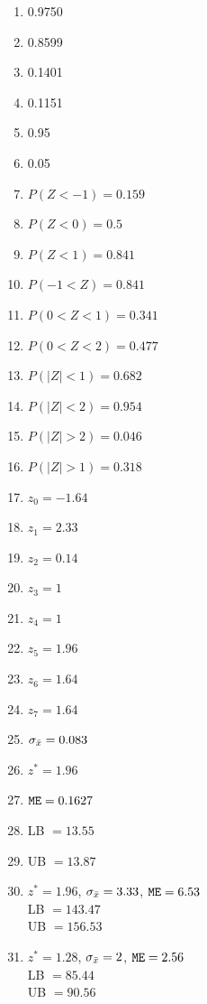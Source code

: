 \documentclass[12pt,letterpaper]{article}
\begin{document}
\newpage
\begin{multicols}{2}
\begin{enumerate}
\item 0.9750
\item 0.8599
\item 0.1401
\item 0.1151
\item 0.95
\item 0.05

\item $P(Z<-1)=0.159$
\item $P(Z<0) = 0.5$
\item $P(Z<1) = 0.841$
\item $P(-1<Z) = 0.841$
\item $P(0<Z<1) = 0.341$
\item $P(0<Z<2) = 0.477$
\item $P(|Z|<1) = 0.682$
\item $P(|Z|<2) = 0.954$
\item $P(|Z|>2) = 0.046$
\item $P(|Z|>1) = 0.318$

\item $z_0 = -1.64$
\item $z_1 = 2.33$
\item $z_2 = 0.14$
\item $z_3 = 1$
\item $z_4 = 1$
\item $z_5 = 1.96$
\item $z_6 = 1.64$
\item $z_7 = 1.64$

\item $\sigma_{\bar{x}} = 0.083$
\item $z^*=1.96$
\item $\mathtt{ME} = 0.1627$
\item LB $= 13.55$
\item UB $= 13.87$

\item $z^*=1.96$, $\sigma_{\bar{x}} = 3.33$, $\mathtt{ME}=6.53$\\ LB $= 143.47$\\ UB $= 156.53$
\item $z^*=1.28$, $\sigma_{\bar{x}} = 2$, $\mathtt{ME}=2.56$\\ LB $= 85.44$\\ UB $= 90.56$


\end{enumerate}
\end{multicols}
\end{document}
